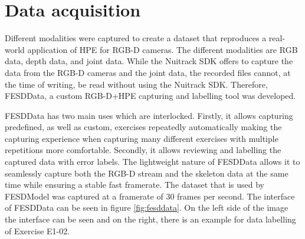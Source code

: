 \section{Data acquisition}
\label{sec:data_acquisition}

Different modalities were captured to create a dataset that reproduces a real-world application of HPE for RGB-D cameras. The different modalities are RGB data, depth data, and joint data. While the Nuitrack SDK offers to capture the data from the RGB-D cameras and the joint data, the recorded files cannot, at the time of writing, be read without using the Nuitrack SDK. Therefore, FESDData, a custom RGB-D+HPE capturing and labelling tool was developed. 

FESDData has two main uses which are interlocked. Firstly, it allows capturing predefined, as well as custom, exercises repeatedly automatically making the capturing experience when capturing many different exercises with multiple repetitions more comfortable. Secondly, it allows reviewing and labelling the captured data with error labels. The lightweight nature of FESDData allows it to seamlessly capture both the RGB-D stream and the skeleton data at the same time while ensuring a stable fast framerate. The dataset that is used by FESDModel was captured at a framerate of 30 frames per second. The interface of FESDData can be seen in figure \ref{fig:fesddata}. On the left side of the image the interface can be seen and on the right, there is an example for data labelling of Exercise E1-02.


